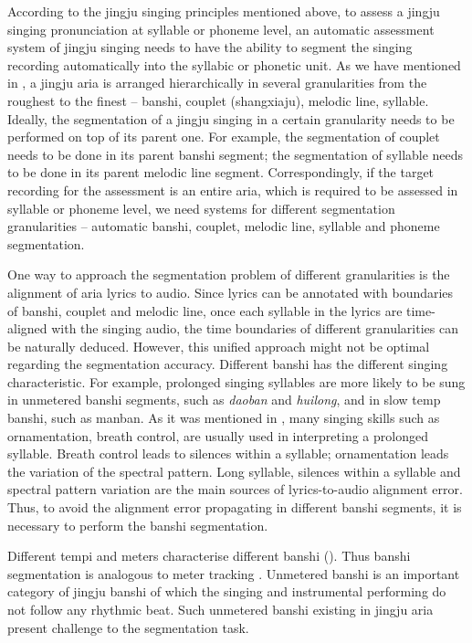 According to the jingju singing principles mentioned above, to assess a jingju singing pronunciation at syllable or phoneme level, an automatic assessment system of jingju singing needs to have the ability to segment the singing recording automatically into the syllabic or phonetic unit. As we have mentioned in , a jingju aria is arranged hierarchically in several granularities from the roughest to the finest -- banshi, couplet (shangxiaju), melodic line, syllable. Ideally, the segmentation of a jingju singing in a certain granularity needs to be performed on top of its parent one. For example, the segmentation of couplet needs to be done in its parent banshi segment; the segmentation of syllable needs to be done in its parent melodic line segment. Correspondingly, if the target recording for the assessment is an entire aria, which is required to be assessed in syllable or phoneme level, we need systems for different segmentation granularities -- automatic banshi, couplet, melodic line, syllable and phoneme segmentation. 

One way to approach the segmentation problem of different granularities is the alignment of aria lyrics to audio. Since lyrics can be annotated with boundaries of banshi, couplet and melodic line, once each syllable in the lyrics are time-aligned with the singing audio, the time boundaries of different granularities can be naturally deduced. However, this unified approach might not be optimal regarding the segmentation accuracy. Different banshi has the different singing characteristic. For example, prolonged singing syllables are more likely to be sung in unmetered banshi segments, such as \textit{daoban} and \textit{huilong}, and in slow temp banshi, such as manban. As it was mentioned in , many singing skills such as ornamentation, breath control, are usually used in interpreting a prolonged syllable. Breath control leads to silences within a syllable; ornamentation leads the variation of the spectral pattern. Long syllable, silences within a syllable and spectral pattern variation are the main sources of lyrics-to-audio alignment error. Thus, to avoid the alignment error propagating in different banshi segments, it is necessary to perform the banshi segmentation.

Different tempi and meters characterise different banshi (). Thus banshi segmentation is analogous to meter tracking \cite{Srinivasamurthy2016}. Unmetered banshi is an important category of jingju banshi of which the singing and instrumental performing do not follow any rhythmic beat. Such unmetered banshi existing in jingju aria present challenge to the segmentation task.

